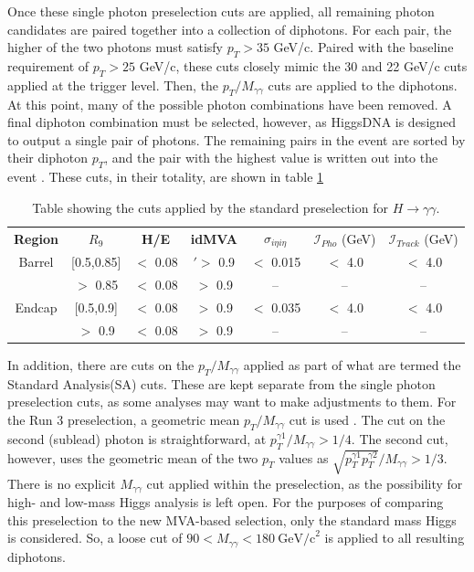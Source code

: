 \documentclass[12pt]{ucsddissertation}
\begin{document}
Once these single photon preselection cuts are applied, all remaining photon candidates are paired together into a collection of diphotons. For each pair, the higher of the two photons must satisfy $p_T > 35$  GeV/c. Paired with the baseline requirement of $p_T > 25$ GeV/c, these cuts closely mimic the 30 and 22 GeV/c cuts applied at the trigger level. Then, the $p_T/M_{\gamma \gamma}$ cuts are applied to the diphotons. At this point, many of the possible photon combinations have been removed. A final diphoton combination must be selected, however, as HiggsDNA is designed to output a single pair of photons. The remaining pairs in the event are sorted by their diphoton $p_T$, and the pair with the highest value is written out into the event \cite{Run2Hgg2018}. These cuts, in their totality, are shown in table \ref{tab:PreselCuts}
\begin{table}
	\centering
	\caption{Table showing the cuts applied by the standard preselection for $H \rightarrow \gamma \gamma$.}
	\label{tab:PreselCuts}
	\begin{tabular}{| c | c | c | c | c | c | c |} 
		\hline
		\textbf{Region} & \textbf{$R_9$} & \textbf{H/E} & \textbf{idMVA} & \textbf{$\sigma_{i \eta i \eta}$} & \textbf{$\mathcal{I}_{Pho}$} (GeV) & \textbf{$\mathcal{I}_{Track}$} (GeV)\\
		\Xhline{2pt}
		Barrel & [0.5,0.85] & $<$ 0.08 & $'
		>$ 0.9 & $<$ 0.015 & $<$ 4.0 & $<$ 4.0\\
		 & $>$ 0.85 & $<$ 0.08 & $>$ 0.9 & -- & -- & --\\
		Endcap & [0.5,0.9] & $<$ 0.08 & $>$ 0.9 & $<$ 0.035 & $<$ 4.0 & $<$ 4.0\\
		 & $>$ 0.9 & $<$ 0.08 & $>$ 0.9 & -- & -- & --\\ 
		\hline
	\end{tabular}
\end{table}

In addition, there are cuts on the $p_T/M_{\gamma \gamma}$ applied as part of what are termed the Standard Analysis(SA) cuts. These are kept separate from the single photon preselection cuts, as some analyses may want to make adjustments to them. For the Run 3 preselection, a geometric mean $p_T/M_{\gamma \gamma}$ cut is used \cite{Run3Hgg2025}. The cut on the second (sublead) photon is straightforward, at $p^{\gamma1}_T/M_{\gamma \gamma} > 1/4$. The second cut, however, uses the geometric mean of the two $p_T$ values as $\sqrt{p^{\gamma1}_T p^{\gamma2}_T }/M_{\gamma \gamma} > 1/3$. There is no explicit $M_{\gamma \gamma}$ cut applied within the preselection, as the possibility for high- and low-mass Higgs analysis is left open. For the purposes of comparing this preselection to the new MVA-based selection, only the standard mass Higgs is considered. So, a loose cut of $90 < M_{\gamma \gamma} < 180 \ \mathrm{GeV/c}^2$ is applied to all resulting diphotons.
\end{document}
